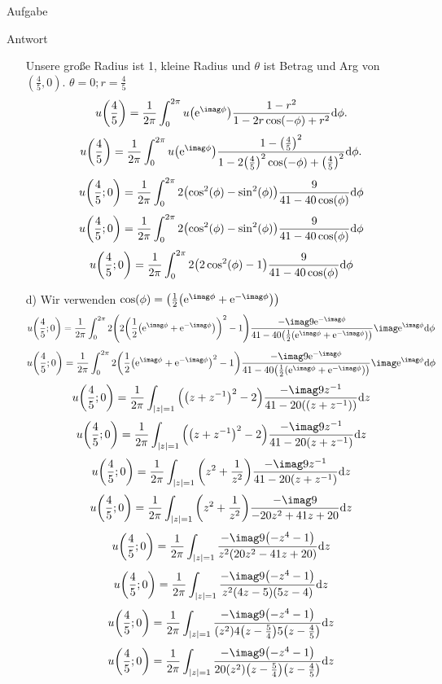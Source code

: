 \documentclass{scrartcl}
\begin{document}
\begin{section}{Aufgabe}
\begin{subsection}{Antwort}
\begin{itemize}
Unsere große Radius ist 1, kleine Radius und $\theta$ ist Betrag und Arg von $(\frac{4}{5},0)$. $\theta=0;r=\frac{4}{5}$
\[u\qty(\frac{4}{5})=\frac{1}{2\pi}\int_0^{2\pi} u\qty(\mathrm{e}^{\imag \phi}) \frac{1-r^2}{1 -2 r \cos(-\phi)+r^2}\dd \phi. \]
\[u\qty(\frac{4}{5})=\frac{1}{2\pi}\int_0^{2\pi} u\qty(\mathrm{e}^{\imag \phi}) \frac{1-\qty(\frac{4}{5})^2}{1 -2 \qty(\frac{4}{5})^2 \cos(-\phi)+\qty(\frac{4}{5})^2}\dd \phi. \]
\[u\qty(\frac{4}{5};0)=\frac{1}{2\pi}\int_0^{2\pi}2\qty(\cos[2](\phi)-\sin[2](\phi))\frac{9}{41-40 \cos (\phi )}\dd\phi \]
\[u\qty(\frac{4}{5};0)=\frac{1}{2\pi}\int_0^{2\pi}2\qty(\cos[2](\phi)-\sin[2](\phi))\frac{9}{41-40 \cos (\phi )} \dd\phi\]
\[u\qty(\frac{4}{5};0)=\frac{1}{2\pi}\int_0^{2\pi}2\qty(2\cos[2](\phi)-1)\frac{9}{41-40 \cos (\phi )}\dd\phi \]

\item[d)] 
Wir verwenden $\cos(\phi)=\qty(\frac{1}{2}\qty(\mathrm{e}^{\imag \phi}+\mathrm{e}^{-\imag \phi}))$ 
\[u\qty(\frac{4}{5};0)=\frac{1}{2\pi}\int_0^{2\pi}2\qty(2\qty(\frac{1}{2}\qty(\mathrm{e}^{\imag \phi}+\mathrm{e}^{-\imag \phi}))^2-1)\frac{- \imag 9 \mathrm{e}^{-\imag \phi}}{41-40 \qty(\frac{1}{2}\qty(\mathrm{e}^{\imag \phi}+\mathrm{e}^{-\imag \phi}))} \imag \mathrm{e}^{\imag \phi}\dd\phi \]
\[u\qty(\frac{4}{5};0)=\frac{1}{2\pi}\int_0^{2\pi}2\qty(\frac{1}{2}\qty(\mathrm{e}^{\imag \phi}+\mathrm{e}^{-\imag \phi})^2-1)\frac{- \imag 9 \mathrm{e}^{-\imag \phi}}{41-40 \qty(\frac{1}{2}\qty(\mathrm{e}^{\imag \phi}+\mathrm{e}^{-\imag \phi}))} \imag \mathrm{e}^{\imag \phi}\dd\phi \]
\[u\qty(\frac{4}{5};0)=\frac{1}{2\pi}\int_{\qty|z|=1}\qty(\qty(z+z^{-1})^2-2)\frac{- \imag 9 z^{-1}}{41-20 \qty(\qty(z+z^{-1}))} \dd z \]
\[u\qty(\frac{4}{5};0)=\frac{1}{2\pi}\int_{\qty|z|=1}\qty(\qty(z+z^{-1})^2-2)\frac{- \imag 9 z^{-1}}{41-20 \qty(z+z^{-1})} \dd z \]
\[u\qty(\frac{4}{5};0)=\frac{1}{2\pi}\int_{\qty|z|=1}\qty(z^2+\frac{1}{z^2})\frac{- \imag 9 z^{-1}}{41-20 \qty(z+z^{-1})} \dd z \]
 \[u\qty(\frac{4}{5};0)=\frac{1}{2\pi}\int_{\qty|z|=1}\qty(z^2+\frac{1}{z^2})\frac{-\imag 9}{-20 z^2+41 z+20} \dd z \]
 \[u\qty(\frac{4}{5};0)=\frac{1}{2\pi}\int_{\qty|z|=1}\frac{-\imag 9\qty(-z^4-1)}{z^2 \qty(20 z^2-41 z+20)} \dd z \]
 \[u\qty(\frac{4}{5};0)=\frac{1}{2\pi}\int_{\qty|z|=1}\frac{-\imag 9\qty(-z^4-1)}{z^2 \qty(4z-5)\qty(5z-4)} \dd z \]
 \[u\qty(\frac{4}{5};0)=\frac{1}{2\pi}\int_{\qty|z|=1}\frac{-\imag 9\qty(-z^4-1)}{\qty(z^2) 4\qty(z-\frac{5}{4})5\qty(z-\frac{4}{5})} \dd z \]
 \[u\qty(\frac{4}{5};0)=\frac{1}{2\pi}\int_{\qty|z|=1}\frac{-\imag 9\qty(-z^4-1)}{20 \qty(z^2)\qty(z-\frac{5}{4})\qty(z-\frac{4}{5})} \dd z \]

\end{itemize}
\end{subsection}
\end{section}
\end{document}
